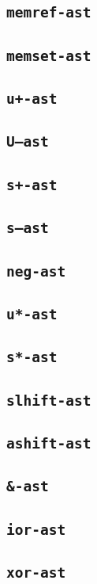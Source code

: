 \subsection{\texttt{memref-ast}}
\subsection{\texttt{memset-ast}}
\subsection{\texttt{u+-ast}}
\subsection{\texttt{U--ast}}
\subsection{\texttt{s+-ast}}
\subsection{\texttt{s--ast}}
\subsection{\texttt{neg-ast}}
\subsection{\texttt{u*-ast}}
\subsection{\texttt{s*-ast}}
\subsection{\texttt{slhift-ast}}
\subsection{\texttt{ashift-ast}}
\subsection{\texttt{\&-ast}}
\subsection{\texttt{ior-ast}}
\subsection{\texttt{xor-ast}}
